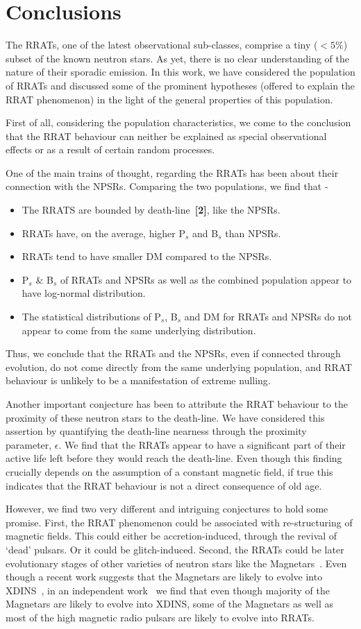 \documentclass{jaa}
\def\i{\item}
\newcommand{\bei}{\begin{itemize}}
\newcommand{\eei}{\end{itemize}}
\begin{document}
\section{Conclusions}
%
The RRATs, one of the latest observational sub-classes, comprise a tiny
($< 5\%$) subset of the known neutron stars. As yet, there is no clear
understanding of the nature of their sporadic emission.  In this work,
we have considered  the population of RRATs and discussed  some of the
prominent hypotheses (offered  to explain the RRAT  phenomenon) in the
light of the general properties of this population.

First of all,  considering the population characteristics,  we come to
the conclusion  that the  RRAT behaviour can  neither be  explained as
special  observational  effects  or  as a  result  of  certain  random
processes.

One of the main trains of  thought, regarding the RRATs has been about
their connection  with the NPSRs.   Comparing the two  populations, we
find that -
%
\bei
%
   \i The RRATS are bounded by death-line~{\bf[2]}, like the NPSRs.
%
   \i RRATs have, on the average, higher P$_s$ and B$_s$ than NPSRs.
%
   \i RRATs tend to have smaller DM compared to the NPSRs.
%
   \i  P$_s$ \&  B$_s$ of  RRATs  and NPSRs  as well  as the  combined
   population appear to have log-normal distribution.
%
   \i The statistical  distributions of P$_s$, B$_s$ and  DM for RRATs
   and  NPSRs  do  not  appear   to  come  from  the  same  underlying
   distribution.
%
\eei
%
Thus,  we conclude  that the  RRATs and  the NPSRs, even if  connected
through  evolution, do  not  come directly  from  the same  underlying
population, and  RRAT behaviour is  unlikely to be a  manifestation of
extreme nulling.

Another important conjecture has been  to attribute the RRAT behaviour
to the  proximity of these neutron  stars to the death-line.   We have
considered  this  assertion  by quantifying  the  death-line  nearness
through the  proximity parameter, $\epsilon$.  We find that  the RRATs
appear to have a significant part of their active life left before they
would  reach  the  death-line.   Even though  this  finding  crucially
depends on the  assumption of a constant magnetic field,  if true this
indicates that the  RRAT behaviour is not a direct  consequence of old
age.

However, we find two very different and intriguing conjectures to hold
some promise.   First, the  RRAT phenomenon  could be  associated with
re-structuring   of   magnetic   fields.    This   could   either   be
accretion-induced, through the revival of  `dead' pulsars. Or it could
be  glitch-induced.  Second,  the  RRATs could  be later  evolutionary
stages   of    other   varieties    of   neutron   stars    like   the
Magnetars~\cite{konar12}.  Even though a recent work suggests that the
Magnetars  are  likely  to  evolve into  XDINS~\cite{jawor22},  in  an
independent work~\cite{chowh22}  we find that even  though majority of
the Magnetars are  likely to evolve into XDINS, some  of the Magnetars
as  well as  most of  the high  magnetic radio  pulsars are  likely to
evolve into RRATs.
\end{document}
